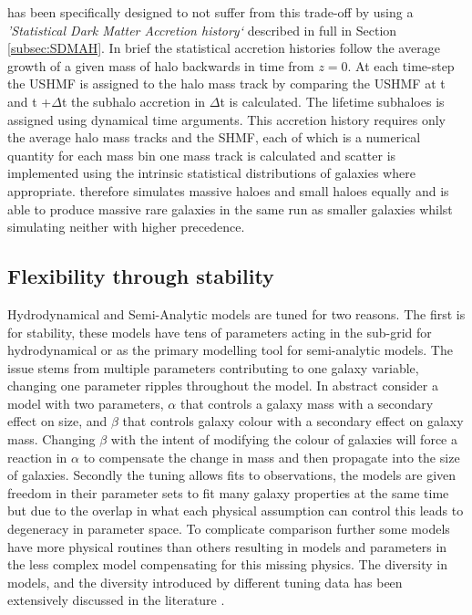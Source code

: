 \steel has been specifically designed to not suffer from this trade-off by using a \textit{'Statistical Dark Matter Accretion history`} described in full in Section \ref{subsec:SDMAH}. In brief the statistical accretion histories follow the average growth of a given mass of halo backwards in time from $z = 0$. At each time-step the USHMF is assigned to the halo mass track by comparing the USHMF at t and t +$\Delta$t the subhalo accretion in $\Delta$t is calculated. The lifetime subhaloes is assigned using dynamical time arguments. This accretion history requires only the average halo mass tracks and the SHMF, each of which is a numerical quantity for each mass bin one mass track is calculated and scatter is implemented using the intrinsic statistical distributions of galaxies where appropriate. \steel therefore simulates massive haloes and small haloes equally and is able to produce massive rare galaxies in the same run as smaller galaxies whilst simulating neither with higher precedence.

\subsection{Flexibility through stability}
Hydrodynamical and Semi-Analytic models are tuned for two reasons. The first is for stability, these models have tens of parameters acting in the sub-grid for hydrodynamical or as the primary modelling tool for semi-analytic models. The issue stems from multiple parameters contributing to one galaxy variable, changing one parameter ripples throughout the model. In abstract consider a model with two parameters, $\alpha$ that controls a galaxy mass with a secondary effect on size, and $\beta$ that controls galaxy colour with a secondary effect on galaxy mass. Changing $\beta$ with the intent of modifying the colour of galaxies will force a reaction in $\alpha$ to compensate the change in mass and then propagate into the size of galaxies. Secondly the tuning allows fits to observations, the models are given freedom in their parameter sets to fit many galaxy properties at the same time but due to the overlap in what each physical assumption can control this leads to degeneracy in parameter space. To complicate comparison further some models have more physical routines than others resulting in models and parameters in the less complex model compensating for this missing physics. The diversity in models, and the diversity introduced by different tuning data has been extensively discussed in the literature \cite{Knebe2015NIFTyModels,Cui2018TheApplications,Knebe2018CosmicModels}.   

